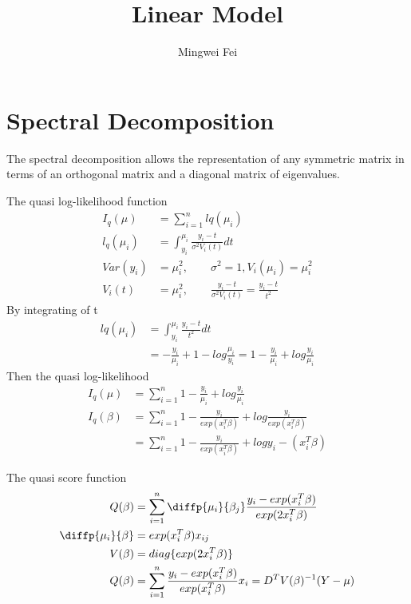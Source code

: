 \documentclass[11pt]{article} %
\title{Linear Model}
\author{Mingwei Fei}
\begin{document}
\maketitle

\section{Spectral Decomposition}
The spectral decomposition allows the representation of any symmetric matrix in terms of an orthogonal matrix and a diagonal matrix of eigenvalues.
 
 
 The quasi log-likelihood function
\begin{align*}
	I_q(\mu) &= \sum_{i=1}^n lq(\mu_i)\\
	l_q(\mu_i) &=\int_{y_i}^{\mu_i} \frac{y_i- t}{\sigma^2 V_i (t)} dt\\
	Var(y_i) &= \mu_i^2,  \qquad \sigma^2 = 1, V_i(\mu_i) = \mu_i^2\\
	V_i (t) &= \mu_i^2, \qquad  \frac{y_i- t}{\sigma^2 V_i (t)} = \frac{y_i - t}{t^2}
\end{align*} 
By integrating of t
\begin{align*}
	lq(\mu_i) &= \int_{y_i}^{\mu_i} \frac{y_i - t}{t^2} dt\\
	&= -\frac{y_i}{\mu_i} + 1 -log \frac{\mu_i}{y_i} = 1- \frac{y_i}{\mu_i} + log \frac{y_i}{\mu_i}
\end{align*} 
Then the quasi log-likelihood
\begin{align*}
	I_q(\mu) &= \sum_{i=1}^n 1- \frac{y_i}{\mu_i} + log \frac{y_i}{\mu_i}\\
	I_q(\beta) &= \sum_{i=1}^n 1- \frac{y_i}{exp(x_i^T\beta)} + log \frac{y_i}{exp(x_i^T\beta)} \\
	&=  \sum_{i=1}^n 1- \frac{y_i}{exp(x_i^T\beta)} + log y_i - {(x_i^T\beta)} 
\end{align*} 

The quasi score function
\begin{align*}
	Q(\beta) &= \sum_{i=1}^n \diffp{\mu_i}{{\beta_j}} \frac{y_i - exp(x_i^T \beta)}{exp(2 x_i^T \beta)} \\
	\diffp{\mu_i}{{\beta}} &= exp( x_i^T \beta) x_{ij} \\
	V(\beta) &= diag \{ exp(2 x_i^T \beta) \} \\
	Q(\beta) &=  \sum_{i=1}^n  \frac{y_i - exp(x_i^T \beta)}{exp( x_i^T \beta)} x_{i} = D^T V(\beta)^{-1} (Y- \mu) 
\end{align*} 
\end{document}
